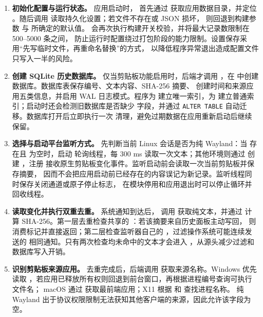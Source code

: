 \documentclass[12pt,a4paper]{ctexart}
\begin{document}
\begin{sloppypar}
\begin{enumerate}[label=(\arabic*)]
  \item \textbf{初始化配置与运行状态。}
    应用启动时， 首先通过 
    获取应用数据目录，并定位 。随后调用
     读取持久化设置；若文件不存在或 JSON 损坏，
    则回退到构建参数  与  所确定的默认值。
     会再次执行构建开关校验，并将最大记录数限制在 500--5000 条之间，
    防止运行时配置绕过打包阶段的能力限制。设置保存采用“先写临时文件，再重命名替换”的方式，
    以降低程序异常退出造成配置文件只写入一半的风险。

  \item \textbf{创建 SQLite 历史数据库。}
    仅当剪贴板功能启用时，后端才调用 ，在
     中创建数据库。数据库表保存编号、文本内容、SHA-256 摘要、
    创建时间和来源应用五类信息，并启用 WAL 日志模式。程序为 
    建立唯一索引，为  建立普通索引；启动时还会检测旧数据库是否缺少
     字段，并通过 \texttt{ALTER TABLE} 自动迁移。数据库打开后立即执行一次
    清理，避免过期数据在应用重新启动后继续保留。

  \item \textbf{选择与启动平台监听方式。}
     先判断当前 Linux 会话是否为纯 Wayland：当
     存在且  为空时，启动
     轮询线程，每 300 ms 读取一次文本；其他环境则通过
     创建 ，注册
     接收原生剪贴板变化事件。监听启动前会读取一次当前剪贴板并保存摘要，
    因而不会把应用启动前已经存在的内容误记为新记录。监听线程同时保存关闭通道或原子停止标志，
    在模块停用和应用退出时可以停止循环并  回收线程。

  \item \textbf{读取变化并执行双重去重。}
    系统通知到达后， 调用
     获取纯文本，并通过 
    计算 SHA-256。第一层去重检查共享的 ：若该摘要来自历史面板主动写回，
    则消费标记并直接返回；第二层检查监听器自己的 ，过滤操作系统可能连续发送的
    相同通知。只有两次检查均未命中的文本才会进入 ，从源头减少过滤和数据库写入开销。

  \item \textbf{识别剪贴板来源应用。}
    去重完成后，后端调用  获取来源名称。Windows 优先读取
    ，若应用已释放所有权则回退到前台窗口，再根据进程编号查询可执行文件名；
    macOS 通过  获取最前端应用；X11 根据
     和  查找进程名称。
    纯 Wayland 出于协议权限限制无法获知其他客户端的来源，因此允许该字段为空。


\end{enumerate}
\end{sloppypar}
\end{document}
